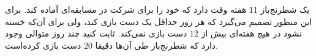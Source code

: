 \EXERCISE
یک شطرنج‌باز
$11$
هفته وقت دارد که خود را برای شرکت در مسابقه‌ای آماده کند. برای این منظور تصمیم می‌گیرد که هر روز حداقل یک دست بازی کند، ولی برای آن‌که خسته نشود در هیچ هفته‌ای بیش از
$12$
دست بازی نمی‌کند. ثابت کنید چند روز متوالی وجود دارد که شطرنج‌باز طی آن‌ها دقیقا
$20$
دست بازی کرده‌است.